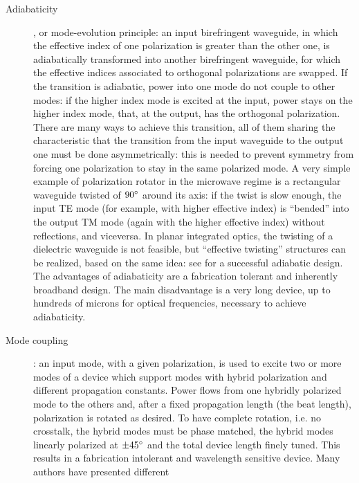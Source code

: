 \begin{description}
\item[Adiabaticity], or
  mode-evolution principle: an input
  birefringent waveguide, in which the
  effective index of one polarization is
  greater than the other one, is adiabatically transformed into
  another birefringent waveguide, for which the effective indices
  associated to orthogonal polarizations are swapped. If the
  transition is adiabatic, power into one mode do not couple to other
  modes: if the higher index mode is excited at the input, power stays
  on the higher index mode, that, at the output, has the orthogonal
  polarization. There are many ways to achieve this transition, all of
  them sharing the characteristic that the transition from the input
  waveguide to the output one must be done asymmetrically: this is
  needed to prevent symmetry from forcing one polarization to stay in
  the same polarized mode. A very simple example of polarization
  rotator in the microwave regime is a rectangular waveguide twisted
  of $90^\circ$ around its axis: if the twist is slow enough, the
  input TE mode (for example, with higher effective index) is
  ``bended'' into the output TM mode (again with the higher effective
  index) without reflections, and viceversa. In planar integrated
  optics, the twisting of a dielectric waveguide is not feasible, but
  ``effective twisting'' structures can be realized, based on the same
  idea: see \cite{watts_integrated} for a successful adiabatic
  design. The advantages of adiabaticity are a fabrication tolerant
  and inherently broadband design. The main disadvantage is a very
  long device, up to hundreds of microns for optical frequencies,
  necessary to achieve adiabaticity.
\item[Mode coupling]: an input mode, with a given
  polarization, is used to excite two or more modes of a device which
  support modes with hybrid polarization
  and different propagation constants. Power flows from one hybridly
  polarized mode to the others and, after a fixed propagation length
  (the beat length), polarization is rotated as
  desired. To have complete rotation, i.e. no crosstalk, the hybrid
  modes must be phase matched, the hybrid modes
  linearly polarized at $\pm 45^\circ$ and the total device length
  finely tuned. This results in a fabrication intolerant and
  wavelength sensitive device. Many authors have presented different

\end{description}
